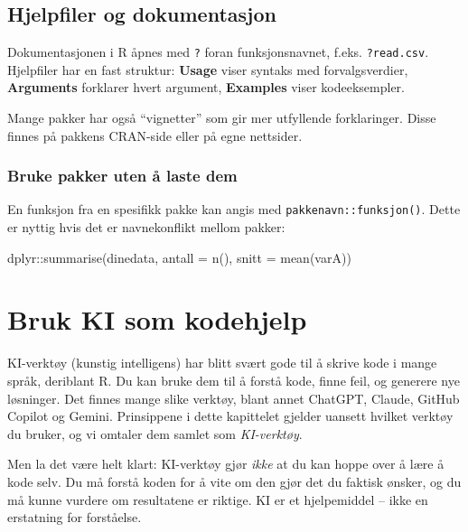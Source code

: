 \documentclass[
  norsk,
  letterpaper,
  DIV=11,
  numbers=noendperiod]{scrreprt}
\newenvironment{Shaded}{\begin{snugshade}}{\end{snugshade}}
\newcommand{\AttributeTok}[1]{\textcolor[rgb]{0.40,0.45,0.13}{#1}}
\newcommand{\FunctionTok}[1]{\textcolor[rgb]{0.28,0.35,0.67}{#1}}
\newcommand{\NormalTok}[1]{\textcolor[rgb]{0.00,0.23,0.31}{#1}}
\newcommand{\SpecialCharTok}[1]{\textcolor[rgb]{0.37,0.37,0.37}{#1}}
\theoremstyle{definition}
\theoremstyle{remark}
\begin{document}
\section{Hjelpfiler og dokumentasjon}\label{hjelpfiler-og-dokumentasjon}

Dokumentasjonen i R åpnes med \texttt{?} foran funksjonsnavnet, f.eks.
\texttt{?read.csv}. Hjelpfiler har en fast struktur: \textbf{Usage}
viser syntaks med forvalgsverdier, \textbf{Arguments} forklarer hvert
argument, \textbf{Examples} viser kodeeksempler.

Mange pakker har også ``vignetter'' som gir mer utfyllende forklaringer.
Disse finnes på pakkens CRAN-side eller på egne nettsider.

\subsection{Bruke pakker uten å laste
dem}\label{bruke-pakker-uten-uxe5-laste-dem}

En funksjon fra en spesifikk pakke kan angis med
\texttt{pakkenavn::funksjon()}. Dette er nyttig hvis det er
navnekonflikt mellom pakker:

\begin{Shaded}
\begin{Highlighting}[]
\NormalTok{dplyr}\SpecialCharTok{::}\FunctionTok{summarise}\NormalTok{(dinedata, }\AttributeTok{antall =} \FunctionTok{n}\NormalTok{(), }\AttributeTok{snitt =} \FunctionTok{mean}\NormalTok{(varA))}
\end{Highlighting}
\end{Shaded}

\chapter{Bruk KI som kodehjelp}\label{bruk-ki-som-kodehjelp}

KI-verktøy (kunstig intelligens) har blitt svært gode til å skrive kode
i mange språk, deriblant R. Du kan bruke dem til å forstå kode, finne
feil, og generere nye løsninger. Det finnes mange slike verktøy, blant
annet ChatGPT, Claude, GitHub Copilot og Gemini. Prinsippene i dette
kapittelet gjelder uansett hvilket verktøy du bruker, og vi omtaler dem
samlet som \emph{KI-verktøy}.

Men la det være helt klart: KI-verktøy gjør \emph{ikke} at du kan hoppe
over å lære å kode selv. Du må forstå koden for å vite om den gjør det
du faktisk ønsker, og du må kunne vurdere om resultatene er riktige. KI
er et hjelpemiddel -- ikke en erstatning for forståelse.
\end{document}
